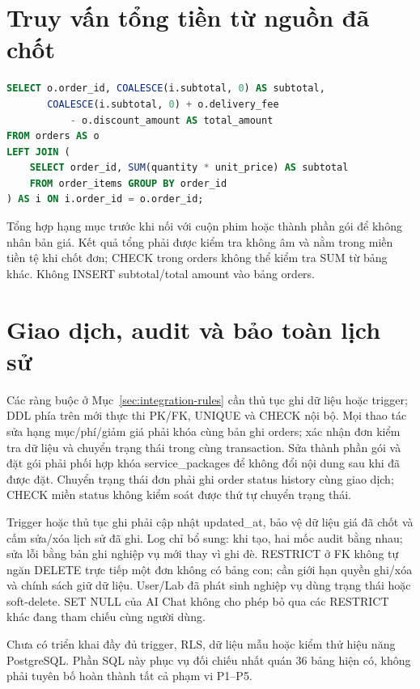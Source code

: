 \section{Truy vấn tổng tiền từ nguồn đã chốt}
\begin{lstlisting}[language=SQL,breaklines=true,basicstyle=\ttfamily\scriptsize]
SELECT o.order_id, COALESCE(i.subtotal, 0) AS subtotal,
       COALESCE(i.subtotal, 0) + o.delivery_fee
           - o.discount_amount AS total_amount
FROM orders AS o
LEFT JOIN (
    SELECT order_id, SUM(quantity * unit_price) AS subtotal
    FROM order_items GROUP BY order_id
) AS i ON i.order_id = o.order_id;
\end{lstlisting}
Tổng hợp hạng mục trước khi nối với cuộn phim hoặc thành phần gói để
không nhân bản giá. Kết quả tổng phải được kiểm tra không âm và nằm trong
miền tiền tệ khi chốt đơn; CHECK trong orders không thể kiểm tra SUM từ
bảng khác. Không INSERT subtotal/total amount vào bảng orders.

\section{Giao dịch, audit và bảo toàn lịch sử}
Các ràng buộc ở Mục~\ref{sec:integration-rules} cần thủ tục ghi dữ liệu
hoặc trigger; DDL phía trên mới thực thi PK/FK, UNIQUE và CHECK nội bộ.
Mọi thao tác sửa hạng mục/phí/giảm giá phải khóa cùng bản ghi orders;
xác nhận đơn kiểm tra dữ liệu và chuyển trạng thái trong cùng transaction.
Sửa thành phần gói và đặt gói phải phối hợp khóa service\_packages để
không đổi nội dung sau khi đã được đặt. Chuyển trạng thái đơn phải ghi
order status history cùng giao dịch; CHECK miền status không kiểm soát
được thứ tự chuyển trạng thái.

Trigger hoặc thủ tục ghi phải cập nhật updated\_at, bảo vệ dữ liệu giá
đã chốt và cấm sửa/xóa lịch sử đã ghi. Log chỉ bổ sung: khi tạo, hai mốc
audit bằng nhau; sửa lỗi bằng bản ghi nghiệp vụ mới thay vì ghi đè.
RESTRICT ở FK không tự ngăn DELETE trực tiếp một đơn không có bảng con;
cần giới hạn quyền ghi/xóa và chính sách giữ dữ liệu. User/Lab đã phát
sinh nghiệp vụ dùng trạng thái hoặc soft-delete. SET NULL của AI Chat
không cho phép bỏ qua các RESTRICT khác đang tham chiếu cùng người dùng.

Chưa có triển khai đầy đủ trigger, RLS, dữ liệu mẫu hoặc kiểm thử hiệu
năng PostgreSQL. Phần SQL này phục vụ đối chiếu nhất quán 36 bảng hiện
có, không phải tuyên bố hoàn thành tất cả phạm vi P1--P5.
